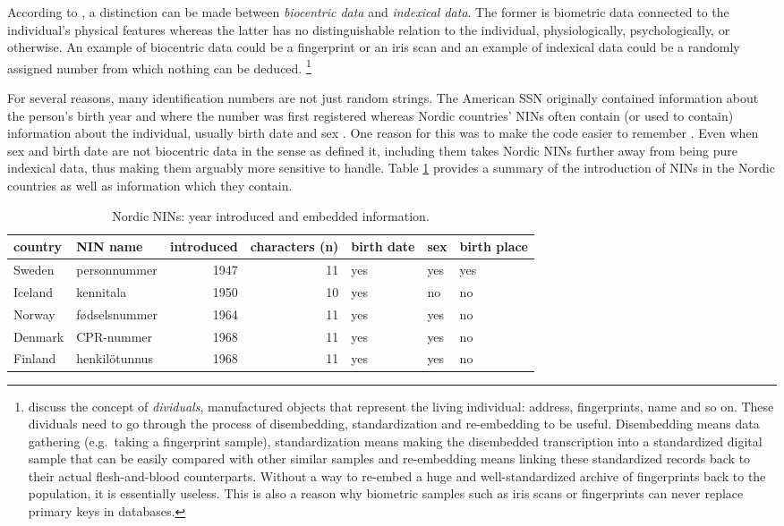 According to \citet{Alterman2003}, a distinction can be made between \emph{biocentric data} and \emph{indexical data}. The former is biometric data connected to the individual's physical features whereas the latter has no distinguishable relation to the individual, physiologically, psychologically, or otherwise. An example of biocentric data could be a fingerprint or an iris scan and an example of indexical data could be a randomly assigned number from which nothing can be deduced. \footnote{\citet{brensinger2021} discuss the concept of \emph{dividuals}, manufactured objects that represent the living individual: address, fingerprints, name and so on. These dividuals need to go through the process of disembedding, standardization and re-embedding to be useful. Disembedding means data gathering (e.g.~taking a fingerprint sample), standardization means making the disembedded transcription into a standardized digital sample that can be easily compared with other similar samples and re-embedding means linking these standardized records back to their actual flesh-and-blood counterparts. Without a way to re-embed a huge and well-standardized archive of fingerprints back to the population, it is essentially useless. This is also a reason why biometric samples such as iris scans or fingerprints can never replace primary keys in databases.}

For several reasons, many identification numbers are not just random strings. The American SSN originally contained information about the person's birth year and where the number was first registered \citep[32]{brensinger2021} whereas Nordic countries' NINs often contain (or used to contain) information about the individual, usually birth date and sex \citep{watson2010, salste2021}. One reason for this was to make the code easier to remember \citep{alastalo2022}. Even when sex and birth date are not biocentric data in the sense as \citet{Alterman2003} defined it, including them takes Nordic NINs further away from being pure indexical data, thus making them arguably more sensitive to handle. Table \ref{tab:nin-table} provides a summary of the introduction of NINs in the Nordic countries as well as information which they contain.

\begin{table}[!h]
\centering
\caption{\label{tab:nin-table}Nordic NINs: year introduced and embedded information.}
\centering
\begin{tabular}[t]{llrrlll}
\toprule
country & NIN name & introduced & characters (n) & birth date & sex & birth place\\
\midrule
Sweden & personnummer & 1947 & 11 & yes & yes & yes\\
Iceland & kennitala & 1950 & 10 & yes & no & no\\
Norway & fødselsnummer & 1964 & 11 & yes & yes & no\\
Denmark & CPR-nummer & 1968 & 11 & yes & yes & no\\
Finland & henkilötunnus & 1968 & 11 & yes & yes & no\\
\bottomrule
\end{tabular}
\end{table}

